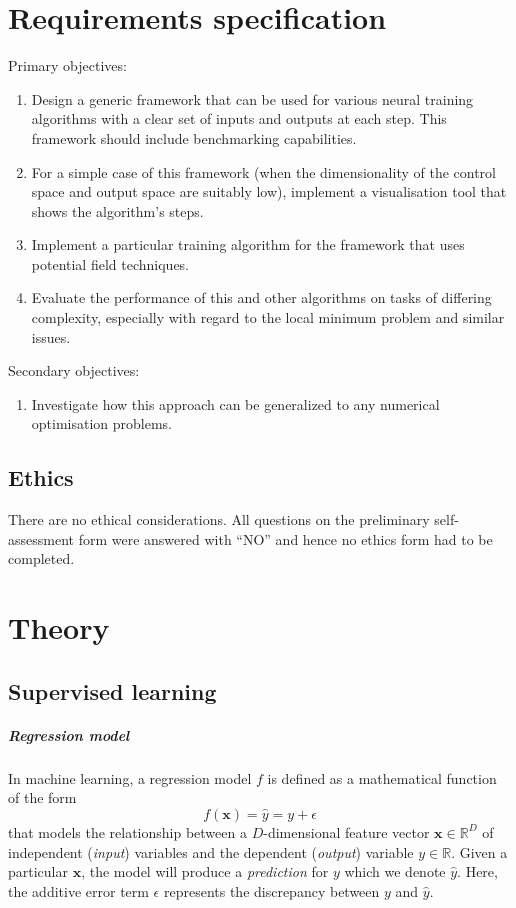 \documentclass{report}
\renewcommand\vec{\mathbf}
\begin{document}
\chapter{Requirements specification}
Primary objectives:
\begin{enumerate}
    \item Design a generic framework that can be used for various neural training algorithms
    with a clear set of inputs and outputs at each step. This framework should include
    benchmarking capabilities.
    \item For a simple case of this framework (when the dimensionality of the control space
    and output space are suitably low), implement a visualisation tool that shows the
    algorithm’s steps.
    \item Implement a particular training algorithm for the framework that uses potential field
    techniques.
    \item Evaluate the performance of this and other algorithms on tasks of differing
    complexity, especially with regard to the local minimum problem and similar issues.
\end{enumerate}
Secondary objectives:
\begin{enumerate}
    \item Investigate how this approach can be generalized to any numerical optimisation problems.
\end{enumerate}

\section{Ethics}
There are no ethical considerations. 
All questions on the preliminary self-assessment form were answered with ``NO'' and hence no ethics form had to be completed.

\chapter{Theory}
\section{Supervised learning}

\paragraph{Regression model}
In machine learning, a regression model $f$ is defined as a mathematical function of the form
\begin{equation}
    \label{eq:reg_model}
    f(\vec{x}) = \hat{y} = y + \epsilon
\end{equation}
that models the relationship between a $D$-dimensional feature vector $\vec{x} \in \mathbb{R}^D$ of independent (\textit{input}) variables and the dependent (\textit{output}) variable $y \in \mathbb{R}$. 
Given a particular $\vec{x}$, the model will produce a \textit{prediction} for $y$ which we denote $\hat{y}$.
Here, the additive error term $\epsilon$ represents the discrepancy between $y$ and $\hat{y}$.
\end{document}
